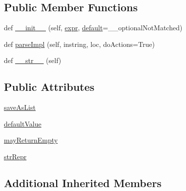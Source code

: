 \subsection*{Public Member Functions}
\begin{DoxyCompactItemize}
\item 
def \hyperlink{classpip_1_1__vendor_1_1pyparsing_1_1Optional_af7743bf78646c9edf865f668e73f5a4a}{\+\_\+\+\_\+init\+\_\+\+\_\+} (self, \hyperlink{classpip_1_1__vendor_1_1pyparsing_1_1ParseElementEnhance_af574b49a0a7d914693fdaa833df7098f}{expr}, \hyperlink{namespacepip_1_1__vendor_1_1pyparsing_aa7f054391cbdb7da5185dae6fabc5acf}{default}=\+\_\+\+\_\+optional\+Not\+Matched)
\item 
def \hyperlink{classpip_1_1__vendor_1_1pyparsing_1_1Optional_a8295c646c3730e129feac4198aeb1035}{parse\+Impl} (self, instring, loc, do\+Actions=True)
\item 
def \hyperlink{classpip_1_1__vendor_1_1pyparsing_1_1Optional_a5aa903625e47739056ebb73a911d4763}{\+\_\+\+\_\+str\+\_\+\+\_\+} (self)
\end{DoxyCompactItemize}
\subsection*{Public Attributes}
\begin{DoxyCompactItemize}
\item 
\hyperlink{classpip_1_1__vendor_1_1pyparsing_1_1Optional_ad4fe641ffece45cd41716cfeb6389433}{save\+As\+List}
\item 
\hyperlink{classpip_1_1__vendor_1_1pyparsing_1_1Optional_a8dbd9a3a8e5e2cc870942e6e08f7d314}{default\+Value}
\item 
\hyperlink{classpip_1_1__vendor_1_1pyparsing_1_1Optional_a7e40ff231f8cfc5dcc2c9c0a828af1cc}{may\+Return\+Empty}
\item 
\hyperlink{classpip_1_1__vendor_1_1pyparsing_1_1Optional_a4c7eaebea3a4d1d2a04c64391f0dd6f0}{str\+Repr}
\end{DoxyCompactItemize}
\subsection*{Additional Inherited Members}


